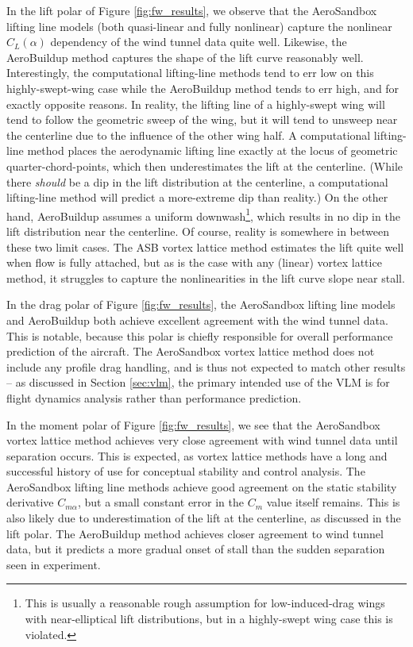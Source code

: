 In the lift polar of Figure \ref{fig:fw_results}, we observe that the AeroSandbox lifting line models (both quasi-linear and fully nonlinear) capture the nonlinear $C_L(\alpha)$ dependency of the wind tunnel data quite well. Likewise, the AeroBuildup method captures the shape of the lift curve reasonably well. Interestingly, the computational lifting-line methods tend to err low on this highly-swept-wing case while the AeroBuildup method tends to err high, and for exactly opposite reasons. In reality, the lifting line of a highly-swept wing will tend to follow the geometric sweep of the wing, but it will tend to unsweep near the centerline due to the influence of the other wing half. A computational lifting-line method places the aerodynamic lifting line exactly at the locus of geometric quarter-chord-points, which then underestimates the lift at the centerline. (While there \emph{should} be a dip in the lift distribution at the centerline, a computational lifting-line method will predict a more-extreme dip than reality.) On the other hand, AeroBuildup assumes a uniform downwash\footnote{This is usually a reasonable rough assumption for low-induced-drag wings with near-elliptical lift distributions, but in a highly-swept wing case this is violated.}, which results in no dip in the lift distribution near the centerline. Of course, reality is somewhere in between these two limit cases. The ASB vortex lattice method estimates the lift quite well when flow is fully attached, but as is the case with any (linear) vortex lattice method, it struggles to capture the nonlinearities in the lift curve slope near stall.

In the drag polar of Figure \ref{fig:fw_results}, the AeroSandbox lifting line models and AeroBuildup both achieve excellent agreement with the wind tunnel data. This is notable, because this polar is chiefly responsible for overall performance prediction of the aircraft. The AeroSandbox vortex lattice method does not include any profile drag handling, and is thus not expected to match other results -- as discussed in Section \ref{sec:vlm}, the primary intended use of the VLM is for flight dynamics analysis rather than performance prediction.

In the moment polar of Figure \ref{fig:fw_results}, we see that the AeroSandbox vortex lattice method achieves very close agreement with wind tunnel data until separation occurs. This is expected, as vortex lattice methods have a long and successful history of use for conceptual stability and control analysis. The AeroSandbox lifting line methods achieve good agreement on the static stability derivative $C_{m \alpha}$, but a small constant error in the $C_m$ value itself remains. This is also likely due to underestimation of the lift at the centerline, as discussed in the lift polar. The AeroBuildup method achieves closer agreement to wind tunnel data, but it predicts a more gradual onset of stall than the sudden separation seen in experiment.

